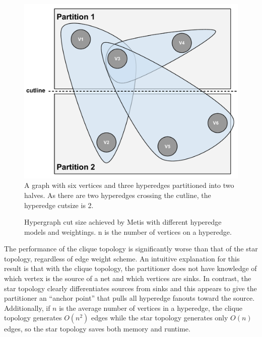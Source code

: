 \begin{figure}[!htbp]
\centering
\includegraphics[width=\linewidth]{hyperedge_cutline.pdf}
\caption{A graph with six vertices and three hyperedges partitioned into two halves. As there are two hyperedges crossing the cutline, the hyperedge cutsize is 2.}
\label{fig:hyperedge_cutline}
\end{figure}

\begin{figure}[!htbp]
\centering
%

\caption{Hypergraph cut size achieved by Metis with different hyperedge models and weightings. n is the number of vertices on a hyperedge.}
\label{fig:graph_topology_cutsize}
\end{figure}

The performance of the clique topology is significantly worse than that of the star topology, regardless of edge weight scheme. An intuitive explanation for this result is that with the clique topology, the partitioner does not have knowledge of which vertex is the source of a net and which vertices are sinks. In contrast, the star topology clearly differentiates sources from sinks and this appears to give the partitioner an “anchor point” that pulls all hyperedge fanouts toward the source. Additionally, if $n$ is the average number of vertices in a hyperedge, the clique topology generates $O(n^2)$ edges while the star topology generates only $O(n)$ edges, so the star topology saves both memory and runtime.


